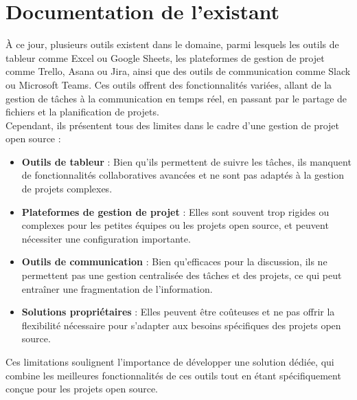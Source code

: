 \section{Documentation de l'existant}

À ce jour, plusieurs outils existent dans le domaine, parmi lesquels les outils de tableur comme Excel ou Google Sheets, les plateformes de gestion de projet comme Trello, Asana ou Jira, ainsi que des outils de communication comme Slack ou Microsoft Teams.
Ces outils offrent des fonctionnalités variées, allant de la gestion de tâches à la communication en temps réel, en passant par le partage de fichiers et la planification de projets. \\

Cependant, ils présentent tous des limites dans le cadre d'une gestion de projet open source :
\begin{itemize}
\item  \textbf{Outils de tableur} : Bien qu'ils permettent de suivre les tâches, ils manquent de fonctionnalités collaboratives avancées et ne sont pas adaptés à la gestion de projets complexes.
\item  \textbf{Plateformes de gestion de projet} : Elles sont souvent trop rigides ou complexes pour les petites équipes ou les projets open source, et peuvent nécessiter une configuration importante.
\item  \textbf{Outils de communication} : Bien qu'efficaces pour la discussion, ils ne permettent pas une gestion centralisée des tâches et des projets, ce qui peut entraîner une fragmentation de l'information.
\item  \textbf{Solutions propriétaires} : Elles peuvent être coûteuses et ne pas offrir la flexibilité nécessaire pour s'adapter aux besoins spécifiques des projets open source.
\end{itemize}
\bigskip
Ces limitations soulignent l'importance de développer une solution dédiée, qui combine les meilleures fonctionnalités de ces outils tout en étant spécifiquement conçue pour les projets open source.
